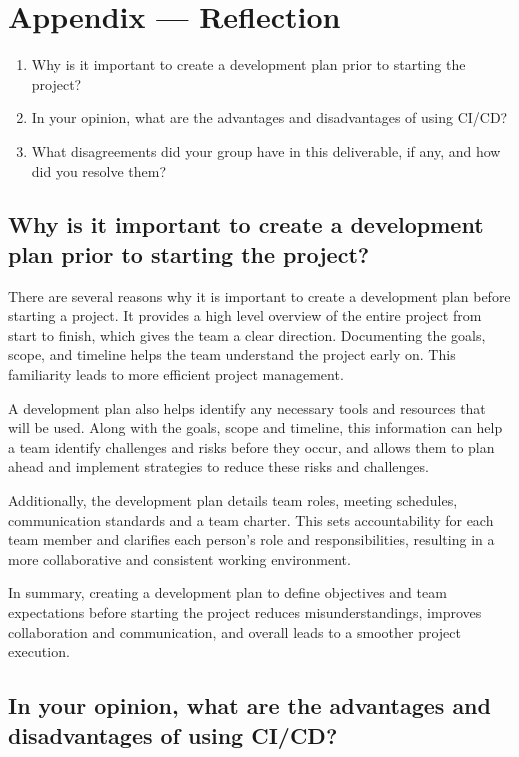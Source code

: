 \documentclass{article}
\begin{document}
\newpage{}

\section*{Appendix --- Reflection}



\begin{enumerate}
    \item Why is it important to create a development plan prior to starting the
    project?
    \item In your opinion, what are the advantages and disadvantages of using
    CI/CD?
    \item What disagreements did your group have in this deliverable, if any,
    and how did you resolve them?
\end{enumerate}

\subsection*{Why is it important to create a development plan prior to starting the project?}

There are several reasons why it is important to create a development plan before starting a project.
It provides a high level overview of the entire project from start to finish, which gives the team a 
clear direction. Documenting the goals, scope, and timeline helps the team understand the project early 
on. This familiarity leads to more efficient project management.

A development plan also helps identify any necessary tools and resources that will be used. Along with the 
goals, scope and timeline, this information can help a team identify challenges and risks before they occur,
and allows them to plan ahead and implement strategies to reduce these risks and challenges. 

Additionally, the development plan details team roles, meeting schedules, communication standards and a 
team charter. This sets accountability for each team member and clarifies each person's role and responsibilities,
resulting in a more collaborative and consistent working environment.

In summary, creating a development plan to define objectives and team expectations before starting the project 
reduces misunderstandings, improves collaboration and communication, and overall leads to a smoother project execution. 

\subsection*{In your opinion, what are the advantages and disadvantages of using CI/CD?}
\end{document}
